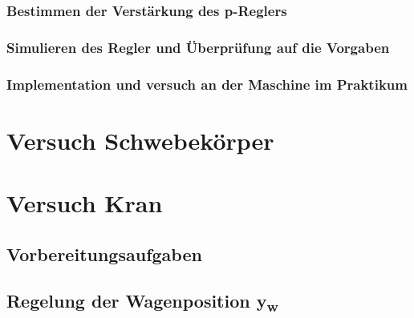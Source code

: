 \documentclass[10pt]{scrartcl}
\begin{document}
\subsubsection{Bestimmen der Verstärkung des p-Reglers}
\subsubsection{Simulieren des Regler und Überprüfung auf die Vorgaben}
\subsubsection{Implementation und versuch an der Maschine im Praktikum}

\section{Versuch Schwebekörper}

\section{Versuch Kran}
\subsection{Vorbereitungsaufgaben}
\subsection{Regelung der Wagenposition y\textsubscript{w}}
\end{document}
